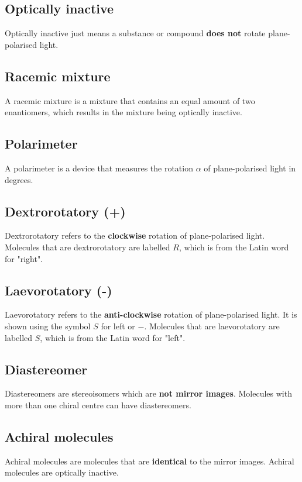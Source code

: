 \documentclass[11pt]{article}
\begin{document}
\subsection{Optically inactive}
\label{sec:org5c6f128}
Optically inactive just means a substance or compound \textbf{does not} rotate plane-polarised light.

\subsection{Racemic mixture}
\label{sec:org37f5303}
A racemic mixture is a mixture that contains an equal amount of two enantiomers, which results in the mixture being optically inactive.

\subsection{Polarimeter}
\label{sec:orgcea039b}
A polarimeter is a device that measures the rotation \(\alpha\) of plane-polarised light in degrees.

\subsection{Dextrorotatory (+)}
\label{sec:org90193ea}
Dextrorotatory refers to the \textbf{clockwise} rotation of plane-polarised light. Molecules that are dextrorotatory are labelled \(R\), which is from the Latin word for "right".

\subsection{Laevorotatory (-)}
\label{sec:org50531eb}
Laevorotatory refers to the \textbf{anti-clockwise} rotation of plane-polarised light. It is shown using the symbol \(S\) for left or \(-\). Molecules that are laevorotatory are labelled \(S\), which is from the Latin word for "left".

\subsection{Diastereomer}
\label{sec:orgfebcb1b}
Diastereomers are stereoisomers which are \textbf{not mirror images}. Molecules with more than one chiral centre can have diastereomers.

\subsection{Achiral molecules}
\label{sec:orgd153df3}
Achiral molecules are molecules that are \textbf{identical} to the mirror images. Achiral molecules are optically inactive.
\end{document}
